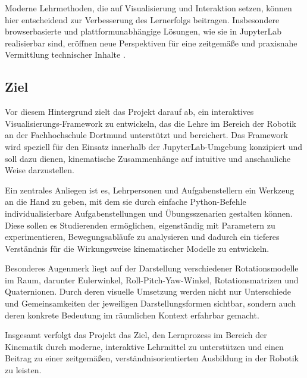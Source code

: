 Moderne Lehrmethoden, die auf Visualisierung und Interaktion setzen, können hier entscheidend zur Verbesserung des Lernerfolgs beitragen.
Insbesondere browserbasierte und plattformunabhängige Lösungen, wie sie in JupyterLab realisierbar sind,
eröffnen neue Perspektiven für eine zeitgemäße und praxisnahe Vermittlung technischer Inhalte \cite[239-240,407]{The_Second_Handbook_of_Research_on_the_Psychology_of_Mathematics_Education}.


\subsection{Ziel}
Vor diesem Hintergrund zielt das Projekt darauf ab, ein interaktives Visualisierungs-Framework zu entwickeln,
das die Lehre im Bereich der Robotik an der Fachhochschule Dortmund unterstützt und bereichert.
Das Framework wird speziell für den Einsatz innerhalb der JupyterLab-Umgebung konzipiert und soll dazu dienen,
kinematische Zusammenhänge auf intuitive und anschauliche Weise darzustellen.

Ein zentrales Anliegen ist es, Lehrpersonen und Aufgabenstellern ein Werkzeug an die Hand zu geben,
mit dem sie durch einfache Python-Befehle individualisierbare Aufgabenstellungen und Übungsszenarien gestalten können.
Diese sollen es Studierenden ermöglichen, eigenständig mit Parametern zu experimentieren,
Bewegungsabläufe zu analysieren und dadurch ein tieferes Verständnis für die Wirkungsweise kinematischer Modelle zu entwickeln.

Besonderes Augenmerk liegt auf der Darstellung verschiedener Rotationsmodelle im Raum,
darunter Eulerwinkel, Roll-Pitch-Yaw-Winkel, Rotationsmatrizen und Quaternionen.
Durch deren visuelle Umsetzung werden nicht nur Unterschiede und Gemeinsamkeiten der jeweiligen Darstellungsformen sichtbar,
sondern auch deren konkrete Bedeutung im räumlichen Kontext erfahrbar gemacht.

Insgesamt verfolgt das Projekt das Ziel, den Lernprozess im Bereich der Kinematik durch moderne,
interaktive Lehrmittel zu unterstützen und einen Beitrag zu einer zeitgemäßen, verständnisorientierten Ausbildung in der Robotik zu leisten.
